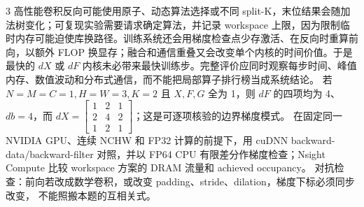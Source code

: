 \begin{solutionexercise}{3}
高性能卷积反向可能使用原子、动态算法选择或不同 split-K，末位结果会随加法树变化；可复现实验需要请求确定算法，并记录 workspace 上限，因为限制临时内存可能迫使库换路径。训练系统还会用梯度检查点少存激活、在反向时重算前向，以额外 FLOP 换显存；融合和通信重叠又会改变单个内核的时间价值。于是最快的 $dX$ 或 $dF$ 内核未必带来最快训练步。完整评价应同时观察每步时间、峰值内存、数值波动和分布式通信，而不能把局部算子排行榜当成系统结论。
\variantheading 若 $N=M=C=1,H=W=3,K=2$ 且 $X,F,G$ 全为 1，则 $dF$ 的四项均为 4、$db=4$，而 $dX=\begin{bmatrix}1&2&1\\2&4&2\\1&2&1\end{bmatrix}$；这是可逐项核验的边界梯度模式。
\practiceheading 在固定同一 NVIDIA GPU、连续 NCHW 和 FP32 计算的前提下，用 cuDNN backward-data/backward-filter 对照，并以 FP64 CPU 有限差分作梯度检查；Nsight Compute 比较 workspace 方案的 DRAM 流量和 achieved occupancy。
对抗检查：前向若改成数学卷积，或改变 padding、stride、dilation，梯度下标必须同步改变，
不能照搬本题的互相关式。
\end{solutionexercise}

